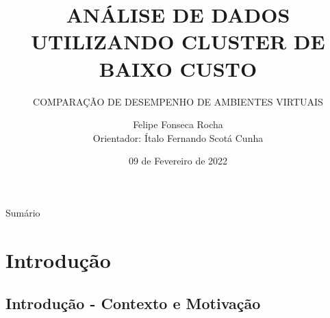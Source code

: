 \documentclass[10pt,brazil]{beamer}
\theoremstyle{definition}
\begin{document}

\title[]{ANÁLISE DE DADOS UTILIZANDO CLUSTER DE BAIXO CUSTO}
\subtitle{COMPARAÇÃO DE DESEMPENHO DE AMBIENTES VIRTUAIS}


\author[Felipe Rocha]{Felipe Fonseca Rocha \\
  \vspace{0.25cm}
  Orientador: Ítalo Fernando Scotá Cunha}
\date{09 de Fevereiro de 2022}

\AtBeginSection{%
  \begin{frame}
    \tableofcontents[currentsection, subsectionstyle=show/show/hide]
  \end{frame}
}
\frame{\maketitle}


\begin{frame}{Sumário}
  \tableofcontents[hideallsubsections]
\end{frame}


%
%

\section{Introdução}

\subsection{Introdução - Contexto e Motivação}
\end{document}
